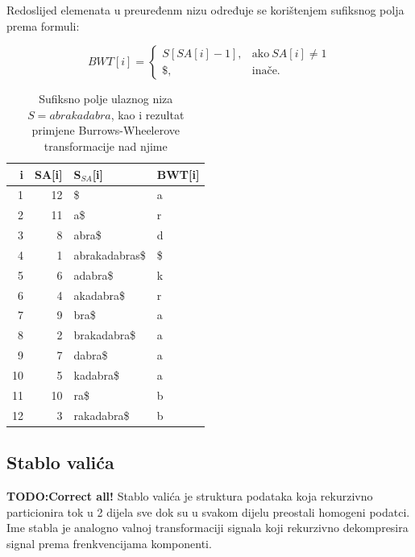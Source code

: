 \documentclass[a4paper,12pt]{article}
\begin{document}
Redoslijed elemenata u preuređenm nizu određuje se korištenjem sufiksnog polja prema formuli:

$$
BWT[i]=
\begin{cases}
S[SA[i]-1], & \text{ako} \  SA[i]\neq 1\\ 
\$, & \text{inače}.
\end{cases}
$$

\begin{table}[h!]
	\caption{Sufiksno polje ulaznog niza $S = abrakadabra$, kao i rezultat primjene Burrows-Wheelerove transformacije nad njime}
	\label{tablePrimjer2}
	\begin{center}
		\begin{tabular}{rrll}
			\toprule
			i & SA[i] & S$_{SA}$[i] & BWT[i] \\
			\midrule
			1 & 12 & \$ & a\\
			2 & 11 &  a\$ & r \\
			3 & 8 & abra\$ & d \\
			4 & 1 & abrakadabras\$ & \$ \\
			5 & 6 & adabra\$ & k \\
			6 & 4 & akadabra\$ & r \\
			7 & 9 & bra\$ & a\\
			8 & 2 & brakadabra\$ & a\\
			9 & 7 & dabra\$ & a \\
			10 & 5 & kadabra\$ & a\\
			11 & 10 & ra\$ & b \\
			12 & 3 & rakadabra\$ & b\\
			\bottomrule
		\end{tabular}
	\end{center}
\end{table} 

\newpage


\subsection{Stablo valića}
\textbf{TODO:Correct all!}
Stablo valića je struktura podataka koja rekurzivno particionira tok u 2 dijela sve dok su u svakom dijelu preostali homogeni podatci. Ime stabla je analogno valnoj transformaciji signala koji rekurzivno dekompresira signal prema frenkvencijama komponenti. 
\end{document}
